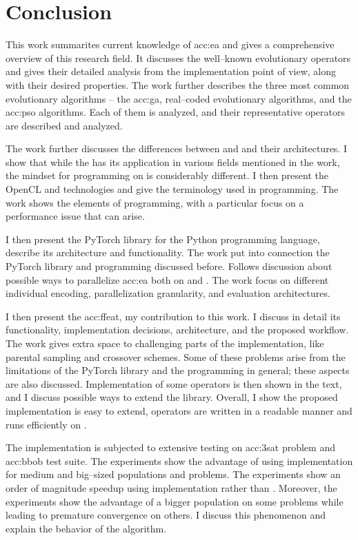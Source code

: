 \chapter{Conclusion}
\label{chap:conclusion}

This work summarites current knowledge of \acrlong*{acc:ea} and gives a comprehensive overview of this research field. It discusses the well--known evolutionary operators and gives their detailed analysis from the implementation point of view, along with their desired properties. The work further describes the three most common evolutionary algorithms -- the \acrlong{acc:ga}, real--coded evolutionary algorithms, and the \acrlong{acc:pso} algorithms. Each of them is analyzed, and their representative operators are described and analyzed.

The work further discusses the differences between \cpu and \gpu and their architectures. I show that while the \gpu has its application in various fields mentioned in the work, the mindset for programming on \gpu is considerably different. I then present the OpenCL and \cuda technologies and give the terminology used in \gpu programming. The work shows the elements of \cuda programming, with a particular focus on a performance issue that can arise. 

I then present the PyTorch library for the Python programming language, describe its architecture and functionality. The work put into connection the PyTorch library and \cuda programming discussed before. Follows discussion about possible ways to parallelize \acrlong{acc:ea} both on \cpu and \gpuns. The work focus on different individual encoding, parallelization granularity, and evaluation architectures.

I then present the \acrfull{acc:ffeat}, my contribution to this work. I discuss in detail its functionality, implementation decisions, architecture, and the proposed workflow. The work gives extra space to challenging parts of the implementation, like parental sampling and crossover schemes. Some of these problems arise from the limitations of the PyTorch library and the \cuda programming in general; these aspects are also discussed. Implementation of some operators is then shown in the text, and I discuss possible ways to extend the library. Overall, I show the proposed implementation is easy to extend, operators are written in a readable manner and runs efficiently on \gpuns.

The implementation is subjected to extensive testing on \acrshort{acc:3sat} problem and \acrshort{acc:bbob} test suite. The experiments show the advantage of using \cuda implementation for medium and big--sized populations and problems. The experiments show an order of magnitude speedup using \cuda implementation rather than \cpuns. Moreover, the experiments show the advantage of a bigger population on some problems while leading to premature convergence on others. I discuss this phenomenon and explain the behavior of the algorithm.

